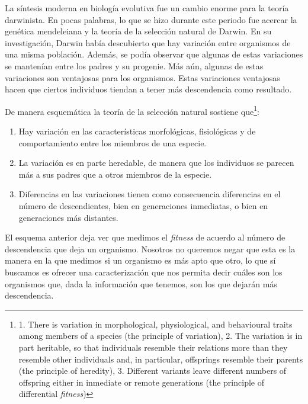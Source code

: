 \noindent La síntesis moderna en biología evolutiva fue un cambio enorme para la teoría darwinista. En pocas palabras, lo que se hizo durante este periodo fue acercar la genética mendeleiana y la teoría de la selección natural de Darwin. En su investigación, Darwin había descubierto que hay variación entre organismos de una misma población. Además, se podía observar que algunas de estas variaciones se mantenían entre los padres y su progenie. Más aún, algunas de estas variaciones son ventajosas para los organismos. Estas variaciones ventajosas hacen que ciertos individuos tiendan a tener más descendencia como resultado.

De manera esquemática la teoría de la selección natural sostiene que\footnote{1. There is variation in morphological, physiological, and behavioural traits among members of a species (the principle of variation), 2. The variation is in part heritable, so that individuals resemble their relations more than they resemble other individuals and, in particular, offsprings resemble their parents (the principle of heredity), 3. Different variants leave different numbers of offspring either in inmediate or remote generations (the principle of differential \emph{fitness})}:

\begin{enumerate}
  \item Hay variación en las características morfológicas, fisiológicas y de comportamiento entre los miembros de una especie.
  \item La variación es en parte heredable, de manera que los individuos se parecen más a sus padres que a otros miembros de la especie.
  \item Diferencias en las variaciones tienen como consecuencia diferencias en el número de descendientes, bien en generaciones inmediatas, o bien en generaciones más distantes\cite{Godfrey-Smith2013}.
\end{enumerate}


El esquema anterior deja ver que medimos el \emph{fitness} de acuerdo al número de descendencia que deja un organismo. Nosotros no queremos negar que esta es la manera en la que medimos si un organismo es más apto que otro, lo que sí buscamos es ofrecer una caracterización que nos permita decir cuáles son los organismos que, dada la información que tenemos, son los que dejarán más descendencia.


